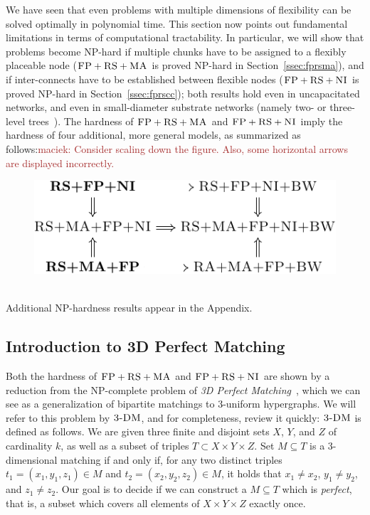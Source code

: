 \documentclass[9pt]{sigcomm-alternate}
\newcommand{\maciek}[1]{\textcolor{brown}{maciek: #1}}
\newcommand{\CC}{\textsc{NI}}
\newcommand{\FP}{\textsc{FP}}
\newcommand{\RS}{\textsc{RS}}
\newcommand{\MA}{\textsc{MA}}
\newcommand{\TDM}{\textsc{3-DM}}
\begin{document}
We have seen that even problems with multiple dimensions of
flexibility can be solved optimally in polynomial time.
This section now points out fundamental
limitations in terms of computational tractability. In particular, we
will show that problems become NP-hard if multiple chunks have to be
assigned to a flexibly placeable node ($\FP+\RS+\MA$ is proved NP-hard in
Section~\ref{ssec:fprsma}), and if inter-connects have to be established
between flexible nodes ($\FP+\RS+\CC$ is proved NP-hard in Section~\ref{ssec:fprscc}); both
results hold even in uncapacitated networks, and even in small-diameter
substrate networks (namely two- or three-level trees~\cite{fattree}).
The hardness of $\FP+\RS+\MA$ and $\FP+\RS+\CC$ imply
the hardness of four additional, more general models, as
summarized as follows:\maciek{Consider scaling down the figure. Also, some horizontal arrows are displayed incorrectly.}\\
\begin{figure}[h!]
\includegraphics[width = \columnwidth]{figs/np_implications}
\end{figure}\\
Additional NP-hardness results appear in the Appendix.


\subsection{Introduction to 3D Perfect Matching}
\label{sec:3dm_intro}

Both the hardness of $\FP+\RS+\MA$ and $\FP+\RS+\CC$ are shown by a reduction
from the NP-complete problem of \emph{3D Perfect Matching}~\cite{3dmatch},
which we can see as a generalization of bipartite matchings to 3-uniform
hypergraphs. We will refer to this problem by $\TDM$, and for completeness,
review it quickly:
$\TDM$ is defined as follows. We are given three finite and disjoint
sets $X$, $Y$, and $Z$ of cardinality $k$, as well as a subset of triples $T\subset
X \times Y \times Z$.  Set $M \subseteq T$ is a 3-dimensional matching
if and only if, for any two distinct triples $t_1=(x_1, y_1, z_1) \in M$
and $t_2=(x_2, y_2, z_2) \in M$, it holds that $x_1\neq x_2$, $y_1\neq
y_2$, and $z_1\neq z_2$. Our goal is to decide if we can construct
a $M \subseteq T$ which is \emph{perfect}, that is, a subset which covers all
elements of $X \times Y \times Z$ exactly once.
\end{document}
